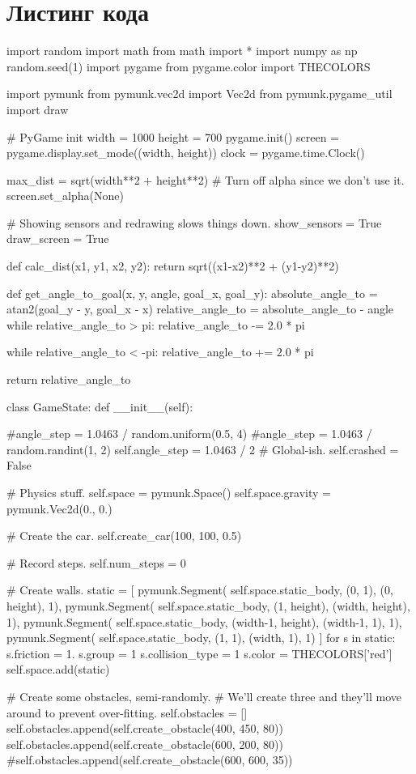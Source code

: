 \chapter{Листинг кода} \label{AppendixB}
\begin{python}
import random
import math
from math import *
import numpy as np
random.seed(1)
import pygame
from pygame.color import THECOLORS

import pymunk
from pymunk.vec2d import Vec2d
from pymunk.pygame_util import draw

# PyGame init
width = 1000
height = 700
pygame.init()
screen = pygame.display.set_mode((width, height))
clock = pygame.time.Clock()

max_dist = sqrt(width**2 + height**2)
# Turn off alpha since we don't use it.
screen.set_alpha(None)

# Showing sensors and redrawing slows things down.
show_sensors = True
draw_screen = True


def calc_dist(x1, y1, x2, y2):
return sqrt((x1-x2)**2 + (y1-y2)**2)

def get_angle_to_goal(x, y, angle, goal_x, goal_y):
absolute_angle_to = atan2(goal_y - y, goal_x - x)
relative_angle_to = absolute_angle_to - angle
while relative_angle_to > pi:
relative_angle_to -= 2.0 * pi

while relative_angle_to < -pi:
relative_angle_to += 2.0 * pi

return relative_angle_to

class GameState:
def __init__(self):

#angle_step = 1.0463 / random.uniform(0.5, 4)
#angle_step = 1.0463 / random.randint(1, 2)
self.angle_step = 1.0463 / 2
# Global-ish.
self.crashed = False

# Physics stuff.
self.space = pymunk.Space()
self.space.gravity = pymunk.Vec2d(0., 0.)

# Create the car.
self.create_car(100, 100, 0.5)

# Record steps.
self.num_steps = 0

# Create walls.
static = [
pymunk.Segment(
self.space.static_body,
(0, 1), (0, height), 1),
pymunk.Segment(
self.space.static_body,
(1, height), (width, height), 1),
pymunk.Segment(
self.space.static_body,
(width-1, height), (width-1, 1), 1),
pymunk.Segment(
self.space.static_body,
(1, 1), (width, 1), 1)
]
for s in static:
s.friction = 1.
s.group = 1
s.collision_type = 1
s.color = THECOLORS['red']
self.space.add(static)

# Create some obstacles, semi-randomly.
# We'll create three and they'll move around to prevent over-fitting.
self.obstacles = []
self.obstacles.append(self.create_obstacle(400, 450, 80))
self.obstacles.append(self.create_obstacle(600, 200, 80))
#self.obstacles.append(self.create_obstacle(600, 600, 35))


\end{python}
